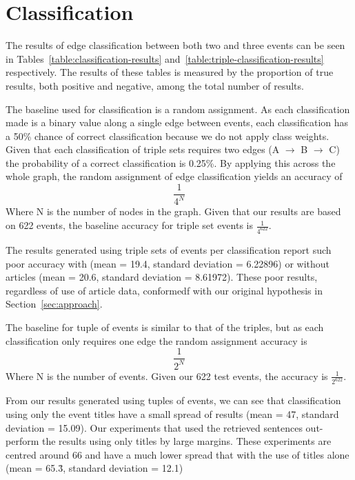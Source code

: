 \documentclass[bsc,frontabs,twoside,singlespacing,parskip,deptreport]{infthesis}     %
\begin{document}
\section{Classification}
The results of edge classification between both two and three events can be seen in Tables~\ref{table:classification-results}
and~\ref{table:triple-classification-results} respectively. The results of these tables is measured by the
proportion of true results, both positive and negative, among the total number of results.

The baseline used for classification is a random assignment.
As each classification made is a binary value along a single edge between events, each classification has a
50\% chance of correct classification because we do not apply class weights.
Given that each classification of triple sets requires two edges (A $\rightarrow$ B $\rightarrow$ C) the probability of a correct
classification is 0.25\%. By applying this across the whole graph, the random assignment of edge classification yields an
accuracy of
\begin{equation}
\frac{1}{4^N} \nonumber
\end{equation}
Where N is the number of nodes in the graph.
Given that our results are based on 622 events, the baseline accuracy for triple set events is $\frac{1}{4^{622}}$.

The results generated using triple sets of events per classification report such poor accuracy with
(mean = 19.4, standard deviation = 6.22896) or without articles (mean = 20.6, standard deviation = 8.61972). These poor results, regardless of use of article data,
conformedf with our original hypothesis in Section~\ref{sec:approach}. 


The baseline for tuple of events is similar to that of the triples, but as each classification only requires one edge
the random assignment accuracy is
\begin{equation}
  \frac{1}{2^N}\nonumber
\end{equation}
Where N is the number of events.
Given our 622 test events, the accuracy is $\frac{1}{2^{622}}$.


From our results generated using tuples of events, we can see that classification using only the event titles
have a small spread of results (mean = 47, standard deviation = 15.09).
Our experiments that used the retrieved sentences out-perform the results using only titles by large margins.
These experiments are centred around 66 and have a much lower spread that with the use of titles alone
(mean = 65.\.{3}, standard deviation = 12.1)
\end{document}
